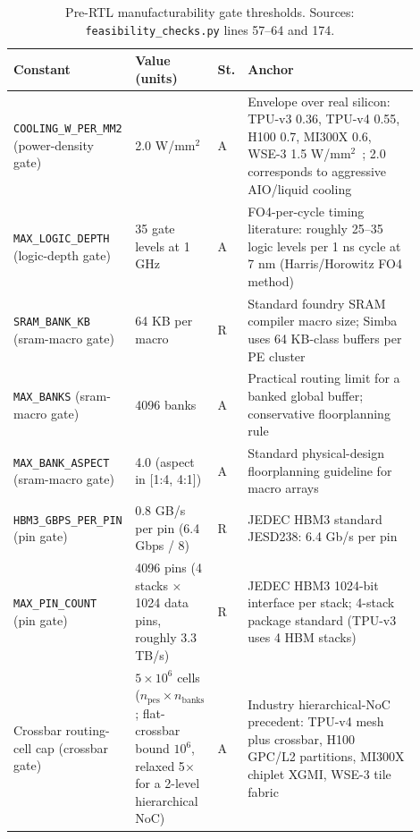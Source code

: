 \begin{table}[!htb]
\centering
\caption{Pre-RTL manufacturability gate thresholds. Sources: \texttt{feasibility\_\allowbreak checks.py} lines 57--64 and 174.}
\label{tab:coeff_gates}
\footnotesize\setlength{\tabcolsep}{3pt}
\begin{tabular}{@{}p{0.26\linewidth}p{0.17\linewidth}p{0.045\linewidth}p{0.42\linewidth}@{}}
\toprule
Constant & Value (units) & St. & Anchor \\
\midrule
\texttt{COOLING\_\allowbreak W\_\allowbreak PER\_\allowbreak MM2} (power-density gate) & 2.0 W/$\mathrm{mm}^2$ & A & Envelope over real silicon: TPU-v3 0.36, TPU-v4 0.55, H100 0.7, MI300X 0.6, WSE-3 1.5 W/$\mathrm{mm}^2$~\citep{jouppi2021ten,jouppi2023tpuv4,nvidia2022hopper,amd2023cdna3,cerebras2024wse3}; 2.0 corresponds to aggressive AIO/liquid cooling \\
\texttt{MAX\_\allowbreak LOGIC\_\allowbreak DEPTH} (logic-depth gate) & 35 gate levels at 1 GHz & A & FO4-per-cycle timing literature: roughly 25--35 logic levels per 1 ns cycle at 7 nm (Harris/Horowitz FO4 method)~\citep{hrishikesh2002fo4,weste2011cmos} \\
\texttt{SRAM\_\allowbreak BANK\_\allowbreak KB} (sram-macro gate) & 64 KB per macro & R & Standard foundry SRAM compiler macro size; Simba uses 64 KB-class buffers per PE cluster \citep{shao2019simba} \\
\texttt{MAX\_\allowbreak BANKS} (sram-macro gate) & 4096 banks & A & Practical routing limit for a banked global buffer; conservative floorplanning rule~\citep{kahng2011vlsi} \\
\texttt{MAX\_\allowbreak BANK\_\allowbreak ASPECT} (sram-macro gate) & 4.0 (aspect in [1:4, 4:1]) & A & Standard physical-design floorplanning guideline for macro arrays~\citep{kahng2011vlsi} \\
\texttt{HBM3\_\allowbreak GBPS\_\allowbreak PER\_\allowbreak PIN} (pin gate) & 0.8 GB/s per pin (6.4 Gbps / 8) & R & JEDEC HBM3 standard JESD238: 6.4 Gb/s per pin~\citep{jedec2022hbm3} \\
\texttt{MAX\_\allowbreak PIN\_\allowbreak COUNT} (pin gate) & 4096 pins (4 stacks $\times$ 1024 data pins, roughly 3.3 TB/s) & R & JEDEC HBM3 1024-bit interface per stack; 4-stack package standard (TPU-v3 uses 4 HBM stacks) \citep{jedec2022hbm3,jouppi2021ten} \\
Crossbar routing-cell cap (crossbar gate) & $5\times10^6$ cells ($n_{\mathrm{pes}} \times n_{\mathrm{banks}}$; flat-crossbar bound $10^6$, relaxed 5$\times$ for a 2-level hierarchical NoC) & A & Industry hierarchical-NoC precedent: TPU-v4 mesh plus crossbar, H100 GPC/L2 partitions, MI300X chiplet XGMI, WSE-3 tile fabric \citep{jouppi2021ten,jouppi2023tpuv4,nvidia2022hopper,amd2023cdna3,cerebras2024wse3} \\
\bottomrule
\end{tabular}

\end{table}

